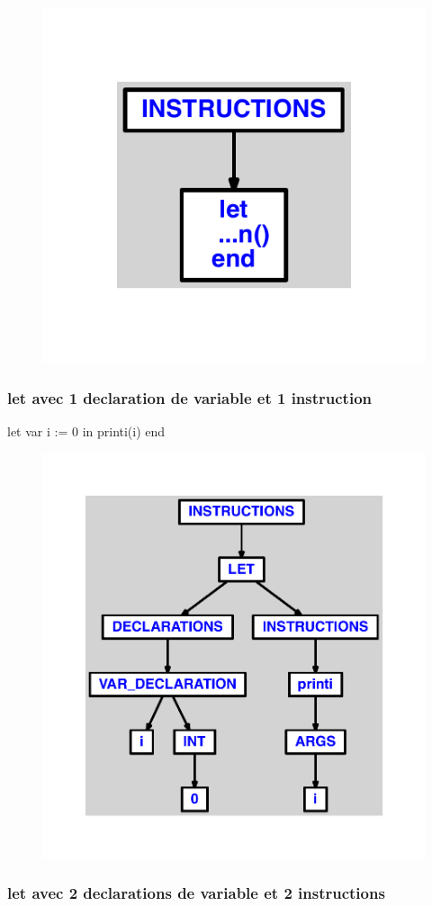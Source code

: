 \documentclass{article}
\begin{document}
\begin{figure}[H]\centering\includegraphics[max width=\textwidth]{ast/ast_265.pdf}\end{figure}\subsubsection{let avec 1 declaration de variable et 1 instruction}
\begin{verbatimtab}
let
	var i := 0
in
	printi(i)
end
\end{verbatimtab}
\begin{figure}[H]\centering\includegraphics[max width=\textwidth]{ast/ast_266.pdf}\end{figure}\subsubsection{let avec 2 declarations de variable et 2 instructions}
\end{document}
